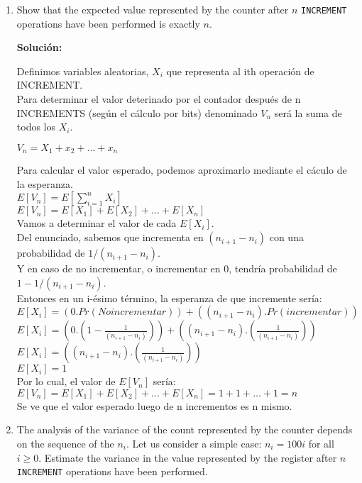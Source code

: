 \documentclass{article}
\begin{document}
\begin{enumerate}[label=(\alph*)]
  \item Show that the expected value represented by the counter after $n$ \texttt{INCREMENT} operations have been performed is exactly $n$.
  
  \textbf{Solución:}
  
  Definimos variables aleatorias, $X_i$ que representa al ith operación de INCREMENT.\\
  Para determinar el valor deterinado por el contador después de n INCREMENTS (según el cálculo por bits) denominado $V_n$ será la suma de todos los $X_i$.
  
  $V_n = X_1 + x_2 + ... + x_n$
  
  Para calcular el valor esperado, podemos aproximarlo mediante el cáculo de la esperanza.\\
  $E[V_n] = E[\sum_{i=1}^{n} X_i]$\\
  $E[V_n] = E[X_1] + E[X_2] + ... + E[X_n]$\\
  
  Vamos a determinar el valor de cada $E[X_i]$.\\
  Del enunciado, sabemos que incrementa en $(n_{i+1}-n_i)$ con una probabilidad de $1/(n_{i+1}-n_i)$.\\
  Y en caso de no incrementar, o incrementar en 0, tendría probabilidad de $1-1/(n_{i+1}-n_i)$.\\
  Entonces en un i-ésimo término, la esperanza de que incremente sería:\\
  $E[X_i] = (0. Pr(No incrementar)) + ((n_{i+1}-n_i). Pr(incrementar))$\\
  $E[X_i] = (0. (1-\frac{1}{(n_{i+1}-n_i)})) + ((n_{i+1}-n_i). (\frac{1}{(n_{i+1}-n_i)}))$\\
  $E[X_i] = ((n_{i+1}-n_i). (\frac{1}{(n_{i+1}-n_i)}))$\\
  $E[X_i] = 1$\\
  Por lo cual, el valor de $E[V_n]$ sería:\\
  $E[V_n] = E[X_1] + E[X_2] + ... + E[X_n] = 1 + 1 + ... + 1 = n$\\
  
  Se ve que el valor esperado luego de n incrementos es n mismo.
  
  \item The analysis of the variance of the count represented by the counter depends on the sequence of the $n_i$. Let us consider a simple case: $n_i=100i$ for all $i\geq0$. Estimate the variance in the value represented by the register after $n$ \texttt{INCREMENT} operations have been performed.
  

\end{enumerate}
\end{document}

